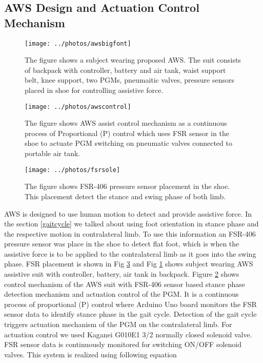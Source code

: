 \documentclass[letterpaper, 10 pt, conference]{ieeeconf}  %
\begin{document}
\subsection{AWS Design and Actuation Control Mechanism}

\begin{figure}
	\centering
	\texttt{[image: ../photos/awsbigfont]}
	\caption{The figure shows a subject wearing proposed AWS. The suit consists of backpack with controller, battery and air tank, waist support belt, knee support, two PGMs, pneumaitic valves, pressure sensors placed in shoe for controlling assistive force.}
	\label{fig:awsbigfont}
\end{figure}


\begin{figure}
	\centering
	\texttt{[image: ../photos/awscontrol]}
	\caption{The figure shows AWS assist control mechanism as a continuous process of Proportional (P) control which uses FSR sensor in the shoe to actuate PGM switching on pneumatic valves connected to portable air tank.}
	\label{fig:awssystem}
\end{figure}
\begin{figure}
	\centering
	\texttt{[image: ../photos/fsrsole]}
	\caption{The figure shows FSR-406 pressure sensor placement in the shoe. This placement detect the stance and swing phase of both limb.}
	\label{fig:fsrsole}
\end{figure}


AWS is designed to use human motion to detect and provide assistive force. In the section \ref{gaitcycle} we talked about using foot orientation in stance phase and the respective motion in contralateral limb. To use this information an FSR-406 pressure sensor was place in the shoe to detect flat foot, which is when the assistive force is to be applied to the contralateral limb as it goes into the swing phase. FSR placement is shown in Fig \ref{fig:fsrsole} and Fig \ref {fig:awsbigfont} shows subject wearing AWS assistive suit with controller, battery, air tank in backpack. Figure \ref{fig:awssystem} shows control mechanism of the AWS suit with FSR-406 sensor based stance phase detection mechanism and actuation control of the PGM. It is a continuous process of proportional (P) control where Arduino Uno board monitors the FSR sensor data to identify stance phase in the gait cycle. Detection of the gait cycle triggers actuation mechanism of the PGM on the contralateral limb. For actuation control we used Kaganei G010E1 3/2 normally closed solenoid valve. FSR sensor data is continuously monitored for switching ON/OFF solenoid valves. This system is realized using following equation 
\end{document}
